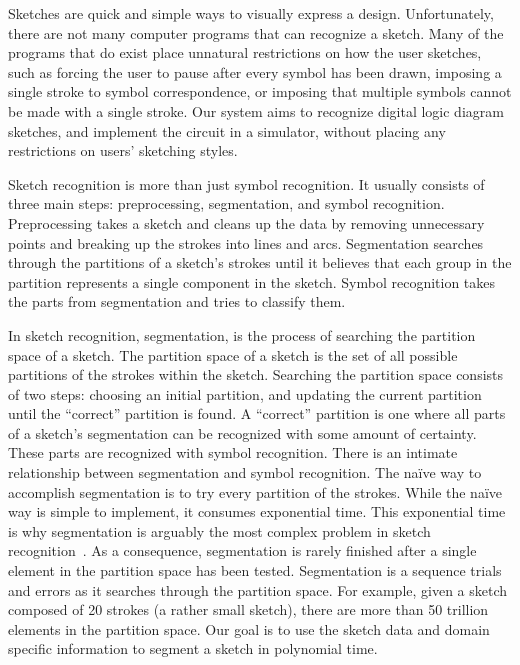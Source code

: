 \documentclass[10pt]{acmsiggraph}               %
\begin{document}

Sketches are quick and simple ways to visually express a design.
Unfortunately, there are not many computer programs that can recognize a sketch.
Many of the programs that do exist place unnatural restrictions on how the user sketches, such as forcing the user to pause after every symbol has been drawn, imposing a single stroke to symbol correspondence, or imposing that multiple symbols cannot be made with a single stroke.
Our system aims to recognize digital logic diagram sketches, and implement the circuit in a simulator, without placing any restrictions on users' sketching styles.

Sketch recognition is more than just symbol recognition.
It usually consists of three main steps: preprocessing, segmentation, and symbol recognition.
Preprocessing takes a sketch and cleans up the data by removing unnecessary points and breaking up the strokes into lines and arcs.
Segmentation searches through the partitions of a sketch's strokes until it believes that each group in the partition represents a single component in the sketch.
Symbol recognition takes the parts from segmentation and tries to classify them.

In sketch recognition, segmentation, is the process of searching the partition space of a sketch.
The partition space of a sketch is the set of all possible partitions of the strokes within the sketch.
Searching the partition space consists of two steps: choosing an initial partition, and updating the current partition until the ``correct'' partition is found.
A ``correct'' partition is one where all parts of a sketch's segmentation can be recognized with some amount of certainty.
These parts are recognized with symbol recognition.
There is an intimate relationship between segmentation and symbol recognition.
The na\"{i}ve way to accomplish segmentation is to try every partition of the strokes.
While the na\"{i}ve way is simple to implement, it consumes exponential time.
This exponential time is why segmentation is arguably the most complex problem in sketch recognition~\cite{pattern}.
As a consequence, segmentation is rarely finished after a single element in the partition space has been tested.
Segmentation is a sequence trials and errors as it searches through the partition space.
For example, given a sketch composed of 20 strokes (a rather small sketch), there are more than 50 trillion elements in the partition space.
Our goal is to use the sketch data and domain specific information to segment a sketch in polynomial time.
\end{document}
